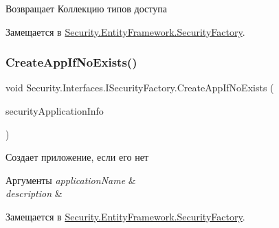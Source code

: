 \begin{DoxyReturn}{Возвращает}
Коллекцию типов доступа
\end{DoxyReturn}


Замещается в \hyperlink{class_security_1_1_entity_framework_1_1_security_factory_aa952c6d768a5219de923e06f2c7a6def}{Security.\+Entity\+Framework.\+Security\+Factory}.

\mbox{\label{interface_security_1_1_interfaces_1_1_i_security_factory_a4a9f62d7a54b60c31bb8243cccafa1c5}} 
\subsubsection{\texorpdfstring{Create\+App\+If\+No\+Exists()}{CreateAppIfNoExists()}}
{\footnotesize\ttfamily void Security.\+Interfaces.\+I\+Security\+Factory.\+Create\+App\+If\+No\+Exists (\begin{DoxyParamCaption}\item[{\hyperlink{interface_security_1_1_interfaces_1_1_i_security_application_info}{I\+Security\+Application\+Info}}]{security\+Application\+Info }\end{DoxyParamCaption})}



Создает приложение, если его нет 


\begin{DoxyParams}{Аргументы}
{\em application\+Name} & \\
\hline
{\em description} & \\
\hline
\end{DoxyParams}


Замещается в \hyperlink{class_security_1_1_entity_framework_1_1_security_factory_af1122c2628a47f986b80bdb99fdfb39c}{Security.\+Entity\+Framework.\+Security\+Factory}.

\mbox{\label{interface_security_1_1_interfaces_1_1_i_security_factory_a95eea08cd755ed6596a8896cb5c2910e}} 
